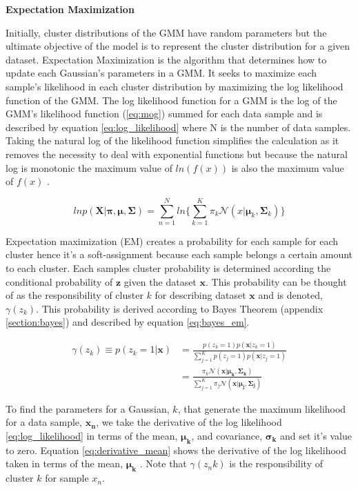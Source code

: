 \textbf{Expectation Maximization}

Initially, cluster distributions of the GMM have random parameters but the ultimate objective of the model is to represent the cluster distribution for a given dataset. Expectation Maximization \cite{dempster_EM}\cite{emalgo} is the algorithm that determines how to update each Gaussian's parameters in a GMM. It seeks to maximize each sample's likelihood in each cluster distribution by maximizing the log likelihood function of the GMM. The log likelihood function for a GMM is the log of the GMM's likelihood function (\ref{eq:mog}) summed for each data sample and is described by equation \ref{eq:log_likelihood} where N is the number of data samples. Taking the natural log of the likelihood function simplifies the calculation as it removes the necessity to deal with exponential functions but because the natural log is monotonic the maximum value of $ln(f(x))$ is also the maximum value of $f(x)$ \cite{patterns_machine_learning}. 

\begin{equation}
\label{eq:log_likelihood}
ln p(\bm{X}|\bm{\pi},\bm{\mu},\bm{\Sigma}) = \sum_{n=1}^N ln \bigg \{ \sum^K_{k=1} \pi_k \mathcal{N}(x|\bm{\mu}_k, \bm{\Sigma}_k) \bigg \}
\end{equation}

Expectation maximization (EM) creates a probability for each sample for each cluster hence it's a soft-assignment because each sample belongs a certain amount to each cluster. Each samples cluster probability is determined according the conditional probability of $\bm{z}$ given the dataset $\bm{x}$. This probability can be thought of as the responsibility of cluster $k$ for describing dataset $\bm{x}$ and is denoted, $\gamma(z_k)$. This probability is derived according to Bayes Theorem (appendix \ref{section:bayes}) and described by equation \ref{eq:bayes_em}.

\begin{align}
    \label{eq:bayes_em}
    \gamma(z_k) \equiv p(z_k = 1|\bm{x}) &= \frac{p(z_k=1)p(\bm{x}|z_k=1)}{\sum\limits_{j=1}^{K}p(z_j=1)p(\bm{x}|z_j=1)}\\
                                     &= \frac{\pi_k \mathcal{N}(\bm{x}|\bm{\mu_k},\bm{\Sigma_k})}{\sum\limits_{j=1}^{K}\pi_j\mathcal{N}(\bm{x}|\bm{\mu_j},\bm{\Sigma_j})}
\end{align}

To find the parameters for a Gaussian, $k$, that generate the maximum likelihood for a data sample, $\bm{x_n}$, we take the derivative of the log likelihood \ref{eq:log_likelihood} in terms of the mean, $\bm{\mu_k}$, and covariance, $\bm{\sigma_k}$ and set it's value to zero. Equation \ref{eq:derivative_mean} shows the derivative of the log likelihood taken in terms of the mean, $\bm{\mu_k}$ \cite{patterns_machine_learning}. Note that $\gamma(z_nk)$ is the responsibility of cluster $k$ for sample $x_n$.


